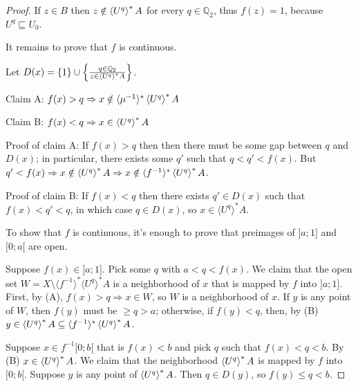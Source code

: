 \begin{proof}
If $z \in B$ then $z \notin \left\langle U^q\right\rangle ^{\ast} A$ for every $q \in
\mathbb{Q}_2$, thus $f (z) = 1$, because $U^q \sqsubseteq U_0$.

It remains to prove that $f$ is continuous.

Let $D (x) = \{ 1 \} \cup \left\{ \frac{ q \in \mathbb{Q}_2 }{
z \in \left\langle U^q\right\rangle ^{\ast} A }\right\}$.

Claim A: $f (x) > q \Rightarrow x \notin \langle \mu^{- 1}
\rangle^{\ast} \left\langle U^q\right\rangle ^{\ast} A$

Claim B: $f (x) < q \Rightarrow x \in \left\langle U^q\right\rangle ^{\ast} A$

Proof of claim A: If $f (x) > q$ then then there must be some gap between $q$
and $D (x)$; in particular, there exists some $q'$ such that $q < q' < f (x)$.
But $q' < f (x) \Rightarrow x \notin \left\langle U^q\right\rangle ^{\ast} A \Rightarrow x
\notin \langle f^{- 1} \rangle^{\ast} \left\langle U^q\right\rangle ^{\ast} A$. 

Proof of claim B: If $f (x) < q$ then there exists $q' \in D (x)$ such that $f
(x) < q' < q$, in which case $q \in D (x)$, so $x \in \langle U^q
\rangle^{\ast} A$.

To show that $f$ is continuous, it's enough to prove that preimages of $] a ;
1]$ and $[0 ; a [$ are open.


Suppose $f (x) \in] a ; 1]$. Pick some $q$ with $a < q < f (x)$. We claim that
the open set $W = X \setminus \langle f^{- 1} \rangle^{\ast} \langle U^q
\rangle^{\ast} A$ is a neighborhood of $x$ that is mapped by $f$ into $] a ;
1]$. First, by (A), $f (x) > q \Rightarrow x \in W$, so $W$ is a neighborhood
of $x$. If $y$ is any point of $W$, then $f (y)$ must be $\geq q > a$;
otherwise, if $f (y) < q$, then, by (B) $y \in \left\langle U^q\right\rangle ^{\ast} A
\subseteq \langle f^{- 1} \rangle^{\ast} \left\langle U^q\right\rangle ^{\ast} A$.

Suppose $x \in f^{- 1} [0 ; b [$ that is $f (x) < b$ and pick $q$ such that $f
(x) < q < b$. By (B) $x \in \left\langle U^q\right\rangle ^{\ast} A$. We claim that the
neighborhood $\left\langle U^q\right\rangle ^{\ast} A$ is mapped by $f$ into $[0 ; b [$.
Suppose $y$ is any point of $\left\langle U^q\right\rangle ^{\ast} A$. Then $q \in D
(y)$, so $f (y) \leq q < b$.

\end{proof}